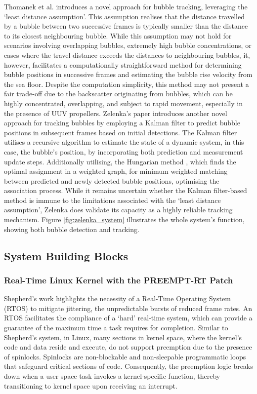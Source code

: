 Thomanek et al. introduces a novel approach for bubble tracking, leveraging the `least distance assumption'. This assumption realises that the distance travelled by a bubble between two successive frames is typically smaller than the distance to its closest neighbouring bubble. While this assumption may not hold for scenarios involving overlapping bubbles, extremely high bubble concentrations, or cases where the travel distance exceeds the distances to neighbouring bubbles, it, however, facilitates a computationally straightforward method for determining bubble positions in successive frames and estimating the bubble rise velocity from the sea floor. Despite the computation simplicity, this method may not present a fair trade-off due to the backscatter originating from bubbles, which can be highly concentrated, overlapping, and subject to rapid movement, especially in the presence of UUV propellers. Zelenka's paper introduces another novel approach for tracking bubbles by employing a Kalman filter \cite{kalmanNewApproachLinear1960} to predict bubble positions in subsequent frames based on initial detections. The Kalman filter utilises a recursive algorithm to estimate the state of a dynamic system, in this case, the bubble's position, by incorporating both prediction and measurement update steps. Additionally utilising, the Hungarian method \cite{kuhnHungarianMethodAssignment1955}, which finds the optimal assignment in a weighted graph, for minimum weighted matching between predicted and newly detected bubble positions, optimising the association process. While it remains uncertain whether the Kalman filter-based method is immune to the limitations associated with the `least distance assumption', Zelenka does validate its capacity as a highly reliable tracking mechanism. Figure \ref{fig:zelenka_system} illustrates the whole system's function, showing both bubble detection and tracking.

\subsection{System Building Blocks}
\label{buildingblocks}

\subsubsection{Real-Time Linux Kernel with the PREEMPT-RT Patch}
\label{preempt}

Shepherd's work highlights the necessity of a Real-Time Operating System (RTOS) to mitigate jittering, the unpredictable bursts of reduced frame rates. An RTOS facilitates the compliance of a `hard' real-time system, which can provide a guarantee of the maximum time a task requires for completion. Similar to Shepherd's system, in Linux, many sections in kernel space, where the kernel's code and data reside and execute, do not support preemption due to the presence of spinlocks. Spinlocks are non-blockable and non-sleepable programmatic loops that safeguard critical sections of code. Consequently, the preemption logic breaks down when a user space task invokes a kernel-specific function, thereby transitioning to kernel space upon receiving an interrupt. 

